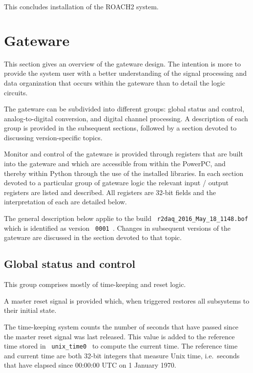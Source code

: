 \documentclass[a4paper,10pt]{article}
\newcommand{\ilcode}[1]{\begingroup
	\setlength{\fboxsep}{1pt}\colorbox{ilcodebg}{\small\tt%
		#1%
	}\endgroup}
\begin{document}
\vspace{\baselineskip}

\noindent This concludes installation of the ROACH2 system.

\section{Gateware}
\label{sec:gateware}
This section gives an overview of the gateware design. The intention is 
more to provide the system user with a better understanding of the 
signal processing and data organization that occurs within the gateware 
than to detail the logic circuits.

The gateware can be subdivided into different groups: global status and 
control, analog-to-digital conversion, and digital channel processing. A 
description of each group is provided in the subsequent sections, 
followed by a section devoted to discussing version-specific topics.

Monitor and control of the gateware is provided through registers that
are built into the gateware and which are accessible from within the 
PowerPC, and thereby within Python through the use of the installed 
libraries. In each section devoted to a particular group of gateware 
logic the relevant input / output registers are listed and described. 
All registers are 32-bit fields and the interpretation of each are 
detailed below.

The general description below applie to the build
\ilcode{r2daq\_2016\_May\_18\_1148.bof} which is identified as version 
\ilcode{0001}. Changes in subsequent versions of the gateware are 
discussed in the section devoted to that topic.

\subsection{Global status and control}
\label{sec:gwctrl}
This group comprises mostly of time-keeping and reset logic.

A master reset signal is provided which, when triggered restores all 
subsystems to their initial state.

The time-keeping system counts the number of seconds that have passed 
since the master reset signal was last released. This value is added to 
the reference time stored in \ilcode{unix\_time0} to compute the 
current time. The reference time and current time are both 32-bit 
integers that measure Unix time, i.e.\ seconds that have elapsed since 
00:00:00 UTC on 1 January 1970.
\end{document}
